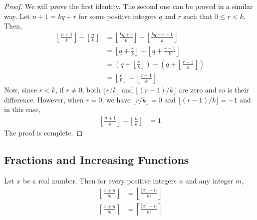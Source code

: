 \documentclass{subfile}
\begin{document}
\begin{proof}
	We will prove the first identity. The second one can be proved in a similar way. Let $n+1=kq+r$ for some positive integers $q$ and $r$ such that $0 \leq r <k$. Then,
	\begin{align*}
		\left\lfloor \frac{n+1}{k} \right\rfloor - \left\lfloor \frac{n}{k} \right\rfloor
		&=\left\lfloor \frac{kq+r}{k} \right\rfloor - \left\lfloor \frac{kq+r-1}{k} \right\rfloor\\
		&= \left\lfloor q+\frac{r}{k} \right\rfloor - \left\lfloor q+\frac{r-1}{k} \right\rfloor\\
		&= \left(q+\left\lfloor \frac{r}{k} \right\rfloor\right) - \left(q+\left\lfloor \frac{r-1}{k} \right\rfloor\right)\\
		&= \left\lfloor \frac{r}{k} \right\rfloor - \left\lfloor \frac{r-1}{k} \right\rfloor
	\end{align*}
	Now, since $r<k$, if $r \neq 0$, both $\lfloor r/k \rfloor$ and $\lfloor (r-1)/k \rfloor$ are zero and so is their difference. However, when $r=0$, we have $\lfloor r/k \rfloor=0$ and $\lfloor (r-1)/k \rfloor=-1$ and in this case,
	\begin{align*}
		\left\lfloor \frac{n+1}{k} \right\rfloor - \left\lfloor \frac{n}{k} \right\rfloor
		& = 1
	\end{align*}
	The proof is complete.
\end{proof}

\subsection{Fractions and Increasing Functions}
\begin{theorem}
	Let $x$ be a real number. Then for every positive integers $n$ and any integer $m$,
	\begin{align*}
		\left\lfloor  \frac{x+n}{m}\right\rfloor
		& = \left\lfloor  \frac{\lfloor x \rfloor+n}{m}\right\rfloor \\
		\left\lceil \frac{x+n}{m}\right\rceil
		& = \left\lceil \frac{\lceil x \rceil+n}{m}\right\rceil
	\end{align*}
\end{theorem}
\end{document}
